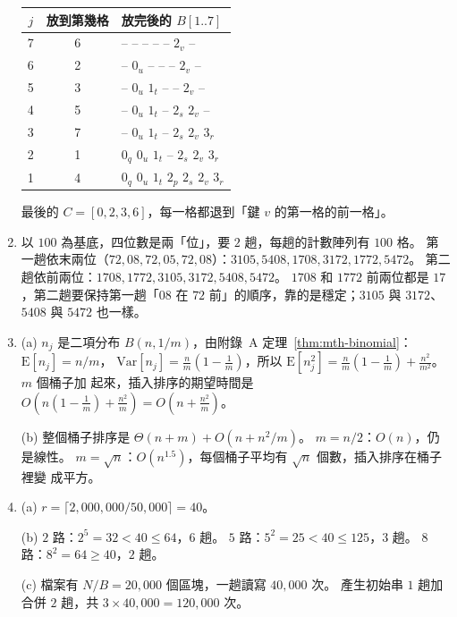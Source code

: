 \begin{enumerate}
\begin{center}
\small
\begin{tabular}{ccl}
\toprule
$j$ & 放到第幾格 & 放完後的 $B[1..7]$ \\
\midrule
7 & 6 & -- -- -- -- -- $2_v$ -- \\
6 & 2 & -- $0_u$ -- -- -- $2_v$ -- \\
5 & 3 & -- $0_u$ $1_t$ -- -- $2_v$ -- \\
4 & 5 & -- $0_u$ $1_t$ -- $2_s$ $2_v$ -- \\
3 & 7 & -- $0_u$ $1_t$ -- $2_s$ $2_v$ $3_r$ \\
2 & 1 & $0_q$ $0_u$ $1_t$ -- $2_s$ $2_v$ $3_r$ \\
1 & 4 & $0_q$ $0_u$ $1_t$ $2_p$ $2_s$ $2_v$ $3_r$ \\
\bottomrule
\end{tabular}
\end{center}
最後的 $C = [0, 2, 3, 6]$，每一格都退到「鍵 $v$ 的第一格的前一格」。

\item 以 $100$ 為基底，四位數是兩「位」，要 $2$ 趟，每趟的計數陣列有 $100$ 格。
第一趟依末兩位（$72, 08, 72, 05, 72, 08$）：$3105, 5408, 1708, 3172, 1772, 5472$。
第二趟依前兩位：$1708, 1772, 3105, 3172, 5408, 5472$。 $1708$ 和 $1772$ 前兩位都是
$17$，第二趟要保持第一趟「$08$ 在 $72$ 前」的順序，靠的是穩定；$3105$ 與 $3172$、
$5408$ 與 $5472$ 也一樣。

\item (a) $n_j$ 是二項分布 $B(n, 1/m)$，由附錄~A 定理~\ref{thm:mth-binomial}：$\mathrm{E}[n_j] = n/m$，
$\mathrm{Var}[n_j] = \frac{n}{m}(1 - \frac{1}{m})$，所以
$\mathrm{E}[n_j^2] = \frac{n}{m}\left(1 - \frac{1}{m}\right) + \frac{n^2}{m^2}$。 $m$ 個桶子加
起來，插入排序的期望時間是
$O\!\left(n\left(1 - \frac{1}{m}\right) + \frac{n^2}{m}\right) = O\!\left(n + \frac{n^2}{m}\right)$。

(b) 整個桶子排序是 $\Theta(n + m) + O(n + n^2/m)$。 $m = n/2$：$O(n)$，仍是線性。
$m = \sqrt{n}$：$O(n^{1.5})$，每個桶子平均有 $\sqrt{n}$ 個數，插入排序在桶子裡變
成平方。

\item (a) $r = \lceil 2{,}000{,}000 / 50{,}000 \rceil = 40$。

(b) $2$ 路：$2^5 = 32 < 40 \le 64$，$6$ 趟。 $5$ 路：$5^2 = 25 < 40 \le 125$，$3$ 趟。
$8$ 路：$8^2 = 64 \ge 40$，$2$ 趟。

(c) 檔案有 $N/B = 20{,}000$ 個區塊，一趟讀寫 $40{,}000$ 次。 產生初始串 $1$ 趟加合併
$2$ 趟，共 $3 \times 40{,}000 = 120{,}000$ 次。


\end{enumerate}
